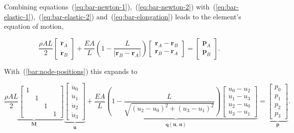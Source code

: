 Combining equations~(\ref{eq:bar-newton-1}),~(\ref{eq:bar-newton-2}) with~(\ref{eq:bar-elastic-1}),~(\ref{eq:bar-elastic-2}) and~(\ref{eq:bar-elongation}) leads to the element's equation of motion,

\begin{equation}
\frac{\rho A L}{2}
\begin{bmatrix}
\ddot{\boldsymbol{r}}_A \\ \ddot{\boldsymbol{r}}_B
\end{bmatrix}
+
\frac{EA}{L}\left( 1 - \frac{L}{|\boldsymbol{r}_B - \boldsymbol{r}_A|} \right)
\begin{bmatrix}
\boldsymbol{r}_A - \boldsymbol{r}_B \\ \boldsymbol{r}_B - \boldsymbol{r}_A
\end{bmatrix}
=
\begin{bmatrix}
\boldsymbol{p}_A \\ \boldsymbol{p}_B
\end{bmatrix}.
\end{equation}

With~(\ref{bar:node-positions}) this expands to

\begin{equation}
\underbrace{
\frac{\rho A L}{2}
\begin{bmatrix}
1\\
& 1\\
&& 1\\
&&& 1
\end{bmatrix}
}_{\boldsymbol{M}}
\underbrace{
\begin{bmatrix}
\ddot{u}_0\\
\ddot{u}_1\\
\ddot{u}_2\\
\ddot{u}_3
\end{bmatrix}
}_{\boldsymbol{\ddot{u}}}
+
\underbrace{
\frac{EA}{L}\left(1 - \frac{L}{\sqrt{(u_2 - u_0)^2 + (u_3 - u_1)^2}}\right)
\begin{bmatrix}
u_0 - u_2\\
u_1 - u_3\\
u_2 - u_0\\
u_3 - u_1
\end{bmatrix}
}_{\boldsymbol{q}(\boldsymbol{u},\,\dot{\boldsymbol{u}})}
=
\underbrace{
\begin{bmatrix}
p_0\\
p_1\\
p_2\\
p_3
\end{bmatrix}
}_{\boldsymbol{p}}.
\end{equation}

